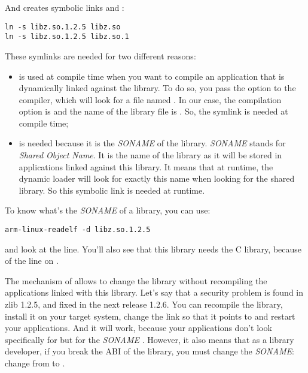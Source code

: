And creates symbolic links  and :

\begin{verbatim}
ln -s libz.so.1.2.5 libz.so
ln -s libz.so.1.2.5 libz.so.1
\end{verbatim}

These symlinks are needed for two different reasons:

\begin{itemize}
\item {} is used at compile time when you want to compile
  an application that is dynamically linked against the library. To do
  so, you pass the  option to the compiler, which will
  look for a file named . In our case, the
  compilation option is  and the name of the library file is
  . So, the  symlink is needed at compile
  time;
\item {} is needed because it is the {\em SONAME} of the
  library. {\em SONAME} stands for {\em Shared Object Name}. It is the
  name of the library as it will be stored in applications linked
  against this library. It means that at runtime, the dynamic loader
  will look for exactly this name when looking for the shared
  library. So this symbolic link is needed at runtime.
\end{itemize}

To know what's the {\em SONAME} of a library, you can use:
\begin{verbatim}
arm-linux-readelf -d libz.so.1.2.5
\end{verbatim}

and look at the  line. You'll also see that this
library needs the C library, because of the  line on
.

The mechanism of  allows to change the library without
recompiling the applications linked with this library. Let's say that
a security problem is found in zlib 1.2.5, and fixed in the next
release 1.2.6. You can recompile the library, install it on your
target system, change the link  so that it points to
 and restart your applications. And it will work,
because your applications don't look specifically for
 but for the {\em SONAME}
. However, it also means that as a library developer,
if you break the ABI of the library, you must change the {\em SONAME}:
change from  to .

